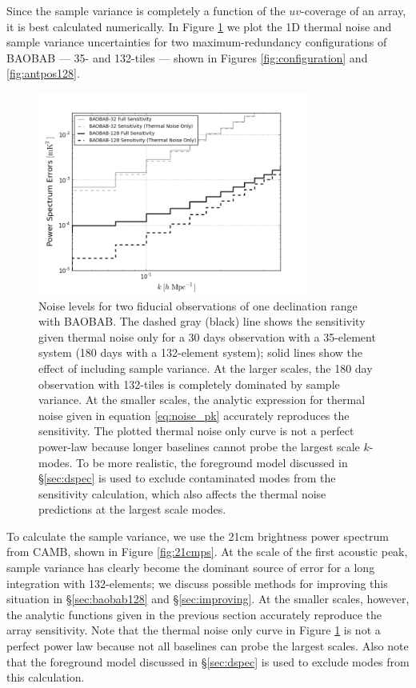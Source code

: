 \documentclass[10pt,iop]{emulateapj}
\begin{document}
Since the sample variance is completely a function of the $uv$-coverage of an array,
it is best calculated
numerically.  In Figure \ref{fig:sense_wwo_samp_var} we plot the 1D thermal noise and 
sample variance uncertainties for
two maximum-redundancy configurations of BAOBAB --- 35- and 132-tiles ---
shown in Figures \ref{fig:configuration} and \ref{fig:antpos128}.
\begin{figure}\centering
\includegraphics[width=3.5in]{sense_wwo_samp_var-3.png}
\caption{Noise levels for two fiducial observations of one declination range with BAOBAB.  
The dashed gray (black) line shows
the sensitivity given thermal noise only for a 30 days observation with a 35-element system
(180 days with a 132-element system); 
solid lines show the effect of including sample variance.  
At the larger scales, the 180 day observation with 132-tiles is completely dominated by sample
variance.
At the smaller scales, the analytic expression for thermal noise
given in equation \ref{eq:noise_pk} accurately reproduces the sensitivity.  The plotted thermal noise
only curve is not a perfect power-law because longer baselines cannot probe the largest scale
$k$-modes.  To be more realistic, the foreground model discussed in \S\ref{sec:dspec}
is used to exclude contaminated modes from the sensitivity calculation, which also affects
the thermal noise predictions at the largest scale modes.
} \label{fig:sense_wwo_samp_var}
\end{figure}  
To calculate the sample variance,
we use the 21cm brightness power spectrum from CAMB, shown in Figure \ref{fig:21cmps}.
At the scale of the first acoustic peak, sample variance has clearly become the dominant source 
of error for a long integration with 132-elements; we discuss possible methods for improving this
situation in \S\ref{sec:baobab128} and \S\ref{sec:improving}.  At the smaller scales, however, the analytic functions given in
the previous section accurately reproduce the array sensitivity.  Note that the thermal noise
only curve in Figure \ref{fig:sense_wwo_samp_var} is not a perfect power law because not all 
baselines can probe the largest scales.  Also note that the foreground model discussed in
\S\ref{sec:dspec} is used to exclude modes from this calculation.
\end{document}
